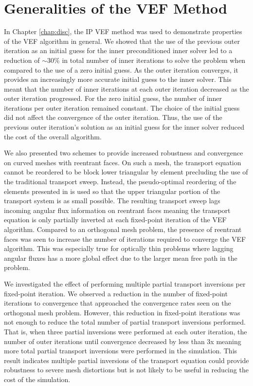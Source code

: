 \documentclass[../doc.tex]{subfiles}
\begin{document}
\section{Generalities of the VEF Method}
In Chapter \ref{chap:disc}, the IP VEF method was used to demonstrate properties of the VEF algorithm in general. We showed that the use of the previous outer iteration as an initial guess for the inner preconditioned inner solver led to a reduction of $\sim 30\%$ in total number of inner iterations to solve the problem when compared to the use of a zero initial guess.
As the outer iteration converges, it provides an increasingly more accurate initial guess to the inner solver. This meant that the number of inner iterations at each outer iteration decreased as the outer iteration progressed. For the zero initial guess, the number of inner iterations per outer iteration remained constant. 
The choice of the initial guess did not affect the convergence of the outer iteration. Thus, the use of the previous outer iteration's solution as an initial guess for the inner solver reduced the cost of the overall algorithm. 

We also presented two schemes to provide increased robustness and convergence on curved meshes with reentrant faces. On such a mesh, the transport equation cannot be reordered to be block lower triangular by element precluding the use of the traditional transport sweep. Instead, the pseudo-optimal reordering of the elements presented in \textcite{graph_sweeps} is used so that the upper triangular portion of the transport system is as small possible. The resulting transport sweep lags incoming angular flux information on reentrant faces meaning the transport equation is only partially inverted at each fixed-point iteration of the VEF algorithm. Compared to an orthogonal mesh problem, the presence of reentrant faces was seen to increase the number of iterations required to converge the VEF algorithm. This was especially true for optically thin problems where lagging angular fluxes has a more global effect due to the larger mean free path in the problem. 

We investigated the effect of performing multiple partial transport inversions per fixed-point iteration. We observed a reduction in the number of fixed-point iterations to convergence that approached the convergence rates seen on the orthogonal mesh problem. However, this reduction in fixed-point iterations was not enough to reduce the total number of partial transport inversions performed. That is, when three partial inversions were performed at each outer iteration, the number of outer iterations until convergence decreased by less than 3x meaning more total partial transport inversions were performed in the simulation. This result indicates multiple partial inversions of the transport equation could provide robustness to severe mesh distortions but is not likely to be useful in reducing the cost of the simulation. 
\end{document}
